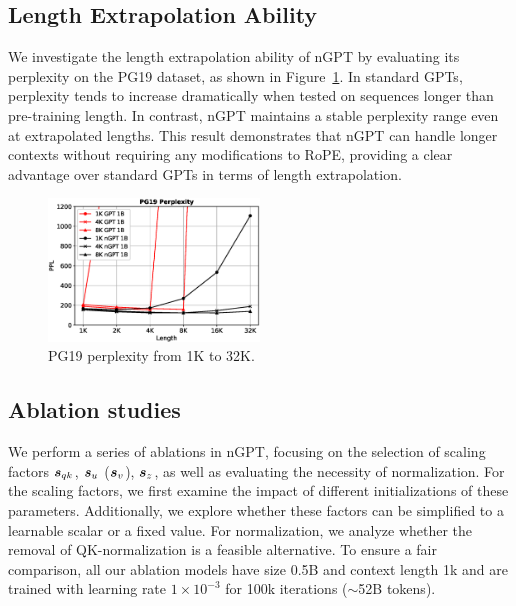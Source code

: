 \documentclass{article} %
\begin{document}
\subsection{Length Extrapolation Ability}
\label{appendix:contextextra}
We investigate the length extrapolation ability of nGPT by evaluating its perplexity on the PG19 dataset, as shown in Figure~\ref{figure_pg19}. In standard GPTs, perplexity tends to increase dramatically when tested on sequences longer than pre-training length. In contrast, nGPT maintains a stable perplexity range even at extrapolated lengths. This result demonstrates that nGPT can handle longer contexts without requiring any modifications to RoPE, providing a clear advantage over standard GPTs in terms of length extrapolation.

\begin{figure}[h] %
    \centering
    \includegraphics[width=0.5\textwidth]{pg19-ppl.eps} %
    \caption{PG19 perplexity from 1K to 32K.}
    \label{figure_pg19}
\end{figure}

\clearpage 
\subsection{Ablation studies}
\label{appendix:ablations}
We perform a series of ablations in nGPT, focusing on the selection of scaling factors ${\bm{s}}_{qk}$, ${\bm{s}}_{u}$ (${\bm{s}}_{v}$), ${\bm{s}}_{z}$, as well as evaluating the necessity of normalization. For the scaling factors, we first examine the impact of different initializations of these parameters. Additionally, we explore whether these factors can be simplified to a learnable scalar or a fixed value. For normalization, we analyze whether the removal of QK-normalization is a feasible alternative. To ensure a fair comparison, all our ablation models have size 0.5B and context length 1k and are trained with learning rate $1 \times 10^{-3}$ for 100k iterations ($\sim$52B tokens).
\end{document}

